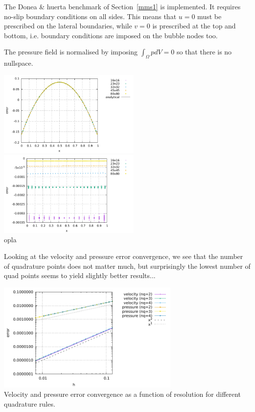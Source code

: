The Donea \& huerta benchmark of Section~\ref{mms1} is implemented. It requires 
no-slip boundary conditions on all sides. This means that $u=0$ must be 
prescribed on the lateral boundaries, while $v=0$ is prescribed at the top and bottom, 
i.e. boundary conditions are imposed on the bubble nodes too.

The pressure field is normalised by imposing $\int_\Omega p dV=0 $ so that there is no nullspace.
\begin{center}
\includegraphics[width=7cm]{python_codes/fieldstone_80/results/pressure}
\includegraphics[width=7cm]{python_codes/fieldstone_80/results/pressure_error}\\
{\captionfont  opla}
\end{center}





Looking at the velocity and pressure error convergence, we see that the number of quadrature
points does not matter much, but surprisingly the lowest number of quad points seems to yield slightly
better results...
\begin{center}
\includegraphics[width=9cm]{python_codes/fieldstone_80/results/errors}\\
{\captionfont Velocity and pressure error convergence as a function of resolution for 
different quadrature rules.}
\end{center}

